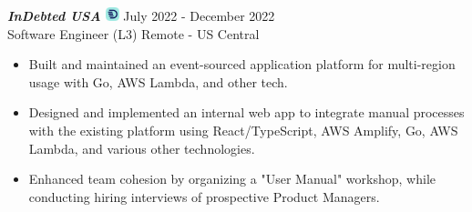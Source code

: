 {\sl \textbf{InDebted USA} \includegraphics[width=0.4cm]{./images/indebted.jpg}} \hfill July 2022 - December 2022 \\
Software Engineer (L3) \hfill Remote - US Central
\begin{itemize}
    \item Built and maintained an event-sourced application platform for multi-region usage with Go, AWS Lambda, and other tech.
    \item Designed and implemented an internal web app to integrate manual processes with the existing platform using React/TypeScript, AWS Amplify, Go, AWS Lambda, and various other technologies.
    \item Enhanced team cohesion by organizing a "User Manual" workshop, while conducting hiring interviews of prospective Product Managers.
\end{itemize}
